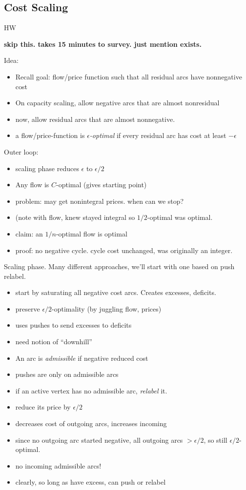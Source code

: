 \documentclass{article}
\begin{document}

\subsection*{Cost Scaling}

HW

\iffalse
{\bf skip this.  takes 15 minutes to survey.  just mention exists.}

Idea:
\begin{itemize}
\item Recall goal: flow/price function such that all residual arcs
  have nonnegative cost
\item On capacity scaling, allow negative arcs that are almost nonresidual
\item now, allow residual arcs that are almost nonnegative.
\item a flow/price-function is {\em $\epsilon$-optimal} if every
  residual arc has cost at least $-\epsilon$
\end{itemize}

Outer loop:
\begin{itemize}
\item scaling phase reduces $\epsilon$ to $\epsilon/2$
\item Any flow is $C$-optimal (gives starting point)
\item problem: may get nonintegral prices.  when can we stop?
\item (note with flow, knew stayed integral so $1/2$-optimal was optimal.
\item claim: an $1/n$-optimal flow is optimal
\item proof: no negative cycle.  cycle cost unchanged, was originally
  an integer.
\end{itemize}

Scaling phase.  Many different approaches, we'll start with one based
on push relabel.
\begin{itemize}
\item start by saturating all negative cost arcs.  Creates excesses,
  deficits.
\item preserve $\epsilon/2$-optimality (by juggling flow, prices)
\item uses pushes to send excesses to deficits
\item need notion of ``downhill''
\item An arc is {\em admissible} if negative reduced cost
\item pushes are only on admissible arcs
\item if an active vertex has no admissible arc, {\em relabel} it.
\item reduce its price by $\epsilon/2$
\item decreases cost of outgoing arcs, increases incoming
\item since no outgoing arc started negative, all outgoing arcs
  $>\epsilon/2$, so still $\epsilon/2$-optimal.
\item no incoming admissible arcs!
\item clearly, so long as have excess, can push or relabel
\end{itemize}
\end{document}
